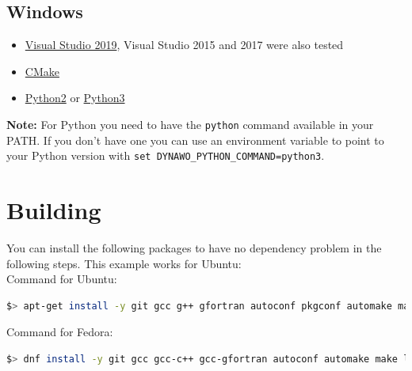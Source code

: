 \documentclass[a4paper, 12pt]{report}
\begin{document}
\subsection{Windows}

\begin{itemize}
\item
  \href{https://visualstudio.microsoft.com}{Visual Studio 2019}, Visual Studio 2015 and 2017 were also tested
\item
  \href{https://cmake.org}{CMake}
\item
  \href{https://www.python.org/ftp/python/2.7.18/python-2.7.18.amd64.msi}{Python2} or \href{https://www.python.org/ftp/python/3.8.2/python-3.8.2-amd64.exe}{Python3}
\end{itemize}

\textbf{Note:} For Python you need to have the \lstinline[language=bash]{python} command available in your PATH. If you don't have one you can use an environment variable to point to your Python version with \lstinline[language=command.com]{set DYNAWO_PYTHON_COMMAND=python3}.

\section[Building Dynawo]{Building \Dynawo}
\label{Dynawo_Installation_Documentation_Building_Dynawo}

You can install the following packages to have no dependency problem in the following steps. This example works for Ubuntu: \\

Command for Ubuntu:

\begin{lstlisting}[language=bash]
$> apt-get install -y git gcc g++ gfortran autoconf pkgconf automake make libtool cmake hwloc openjdk-8-jdk libblas-dev liblpsolve55-dev libarchive-dev doxygen doxygen-latex liblapack-dev libexpat1-dev libsqlite3-dev libxerces-c-dev zlib1g-dev gettext patch clang python-pip libncurses5-dev libreadline-dev libdigest-perl-md5-perl unzip gcovr lcov libboost-all-dev qt4-qmake qt4-dev-tools lsb-release libxml2-utils python-lxml python-psutil wget libcurl4-openssl-dev rsync
\end{lstlisting}

Command for Fedora:

\begin{lstlisting}[language=bash]
$> dnf install -y git gcc gcc-c++ gcc-gfortran autoconf automake make libtool cmake hwloc java-1.8.0-openjdk-devel blas-devel lapack-devel lpsolve-devel expat-devel glibc-devel sqlite-devel xerces-c-devel libarchive-devel zlib-devel doxygen doxygen-latex qt-devel gettext patch wget python-devel clang llvm-devel ncurses-devel readline-devel unzip perl-Digest-MD5 vim gcovr python-pip python-psutil boost-devel lcov gtest-devel gmock-devel xz rsync python-lxml graphviz libcurl-devel
\end{lstlisting}
\end{document}
